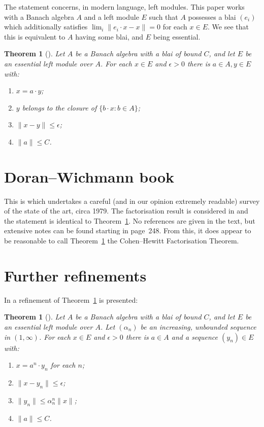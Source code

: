 \documentclass[a4paper,11pt]{article}
\newtheorem{theorem}[lemma]{Theorem}
\theoremstyle{definition}
\begin{document}
The statement concerns, in modern language, left modules.  This paper works with a Banach
algebra $A$ and a left module $E$ such that $A$ possesses a blai $(e_i)$ which additionally
satisfies $\lim_i \|e_i\cdot x-x\| =0$ for each $x\in E$.  We see that this is equivalent to
$A$ having some blai, and $E$ being essential.

\begin{theorem}[{\cite[Theorem~2.5]{hewitt}}]\label{thm:ch}
Let $A$ be a Banach algebra with a blai of bound $C$, and let $E$ be an essential left module
over $A$. For each $x\in E$ and $\epsilon>0$ there is $a\in A, y\in E$ with:
\begin{enumerate}
\item $x = a\cdot y$;
\item $y$ belongs to the closure of $\{b\cdot x : b\in A\}$;
\item $\|x-y\| \leq \epsilon$;
\item $\|a\|\leq C$.
\end{enumerate}  
\end{theorem}


\section{Doran--Wichmann book}

This is \cite{dw} which undertakes a careful (and in our opinion extremely readable) survey
of the state of the art, circa 1979.  The factorisation result is considered in
\cite[Section~16]{dw} and the statement is identical to Theorem~\ref{thm:ch}.  No references
are given in the text, but extensive notes can be found starting in page~248.  From this,
it does appear to be reasonable to call Theorem~\ref{thm:ch} the Cohen--Hewitt Factorisation
Theorem.


\section{Further refinements}

In \cite[Theorem~2.9.24]{dales} a refinement of Theorem~\ref{thm:ch} is presented:

\begin{theorem}[{\cite[Theorem~2.9.24]{dales}}]
Let $A$ be a Banach algebra with a blai of bound $C$, and let $E$ be an essential left module
over $A$.  Let $(\alpha_n)$ be an increasing, unbounded sequence in $(1,\infty)$.
For each $x\in E$ and $\epsilon>0$ there is $a\in A$ and a sequence $(y_n)\in E$ with:
\begin{enumerate}
\item $x = a^n\cdot y_n$ for each $n$;
\item $\|x-y_n\| \leq \epsilon$;
\item $\|y_n\| \leq \alpha^n_n \|x\|$;
\item $\|a\| \leq C$.
\end{enumerate}  
\end{theorem}
\end{document}
